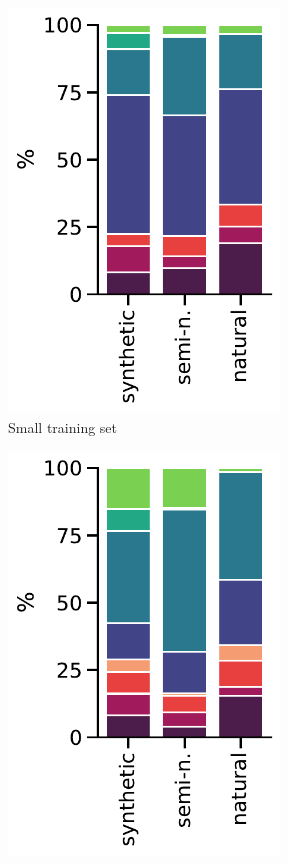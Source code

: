 \begin{figure}[t]\centering
\begin{subfigure}[b]{0.22\textwidth}\centering
\includegraphics[width=0.79\textwidth]{figures/analysis_appendix/substitutivity_small.pdf}
\caption{Small training set}
\end{subfigure}
\begin{subfigure}[b]{0.22\textwidth}\centering
\includegraphics[width=0.79\textwidth]{figures/analysis_appendix/substitutivity_medium.pdf}

\end{subfigure}
\end{figure}
